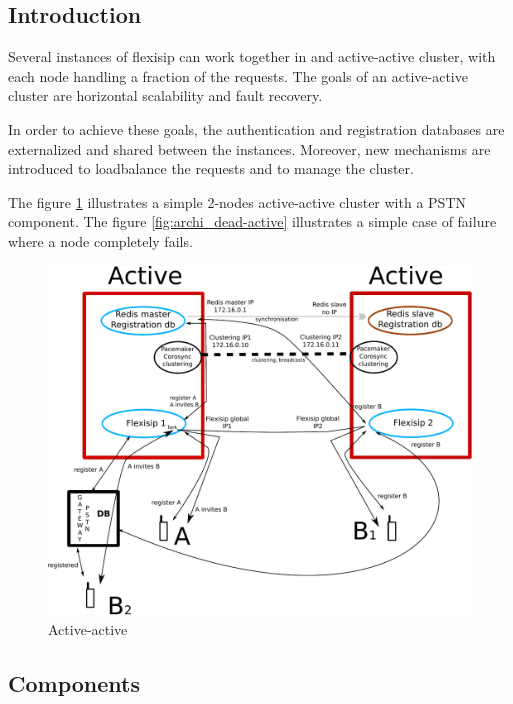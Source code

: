 \documentclass[a4paper,10pt]{article}
\begin{document}
\subsection{Introduction}
Several instances of flexisip can work together in and active-active cluster, with each node handling a fraction of the requests.
The goals of an active-active cluster are horizontal scalability and fault recovery.

In order to achieve these goals, the authentication and registration databases are externalized and shared between the instances.
Moreover, new mechanisms are introduced to loadbalance the requests and to manage the cluster.



The figure \ref{fig:archi_active-active} illustrates a simple 2-nodes active-active cluster with a PSTN component.
The figure \ref{fig:archi_dead-active} illustrates a simple case of failure where a node completely fails.


\begin{figure}[ht!]
 \centering
 \includegraphics[keepaspectratio=true, scale=0.7]{./schema_archi_flexisip_active-active.pdf}
 \caption{Active-active}
 \label{fig:archi_active-active}
\end{figure}


\subsection{Components}
\end{document}
